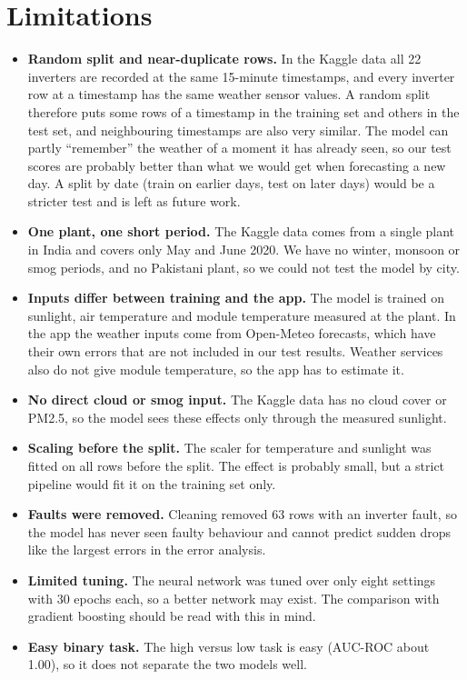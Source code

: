 \section{Limitations}
\begin{itemize}
    \item \textbf{Random split and near-duplicate rows.} In the Kaggle data all 22 inverters are recorded at the same 15-minute timestamps, and every inverter row at a timestamp has the same weather sensor values. A random split therefore puts some rows of a timestamp in the training set and others in the test set, and neighbouring timestamps are also very similar. The model can partly ``remember'' the weather of a moment it has already seen, so our test scores are probably better than what we would get when forecasting a new day. A split by date (train on earlier days, test on later days) would be a stricter test and is left as future work.
    \item \textbf{One plant, one short period.} The Kaggle data comes from a single plant in India and covers only May and June 2020. We have no winter, monsoon or smog periods, and no Pakistani plant, so we could not test the model by city.
    \item \textbf{Inputs differ between training and the app.} The model is trained on sunlight, air temperature and module temperature measured at the plant. In the app the weather inputs come from Open-Meteo forecasts, which have their own errors that are not included in our test results. Weather services also do not give module temperature, so the app has to estimate it.
    \item \textbf{No direct cloud or smog input.} The Kaggle data has no cloud cover or PM2.5, so the model sees these effects only through the measured sunlight.
    \item \textbf{Scaling before the split.} The scaler for temperature and sunlight was fitted on all rows before the split. The effect is probably small, but a strict pipeline would fit it on the training set only.
    \item \textbf{Faults were removed.} Cleaning removed 63 rows with an inverter fault, so the model has never seen faulty behaviour and cannot predict sudden drops like the largest errors in the error analysis.
    \item \textbf{Limited tuning.} The neural network was tuned over only eight settings with 30 epochs each, so a better network may exist. The comparison with gradient boosting should be read with this in mind.
    \item \textbf{Easy binary task.} The high versus low task is easy (AUC-ROC about 1.00), so it does not separate the two models well.
\end{itemize}

